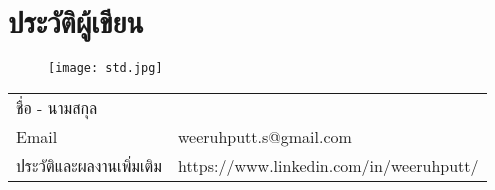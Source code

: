\chapter{ประวัติผู้เขียน}

 \begin{figure}[h]
	\centering
	\texttt{[image: std.jpg]}
	\label{Fig:std.jpg}
\end{figure}

\begin{center}

\begin{tabular}{l l}
	ชื่อ - นามสกุล & \AuName \\
	Email & weeruhputt.s@gmail.com \\
	ประวัติและผลงานเพิ่มเติม & https://www.linkedin.com/in/weeruhputt/ \\
\end{tabular}

\end{center}
